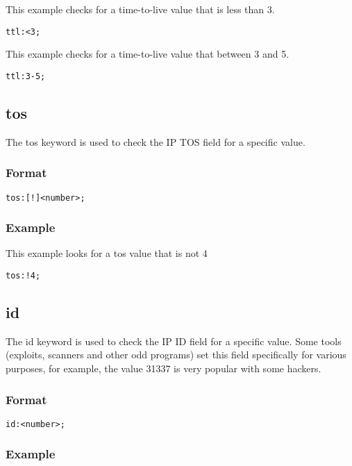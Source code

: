 \documentclass[english]{report}
\begin{document}
This example checks for a time-to-live value that is less than 3.
\begin{verbatim}
ttl:<3;
\end{verbatim}

This example checks for a time-to-live value that between 3 and 5.
\begin{verbatim}
ttl:3-5;
\end{verbatim}

\subsection{tos}

The tos keyword is used to check the IP TOS field for a specific value. 

\subsubsection{Format}

\begin{verbatim}
tos:[!]<number>;
\end{verbatim}

\subsubsection{Example}

This example looks for a tos value that is not 4
\begin{verbatim}
tos:!4;
\end{verbatim}

\subsection{id}

The id keyword is used to check the IP ID field for a specific value.  Some
tools (exploits, scanners and other odd programs) set this field specifically
for various purposes, for example, the value 31337 is very popular with some
hackers. 

\subsubsection{Format}

\begin{verbatim}
id:<number>;
\end{verbatim}

\subsubsection{Example}
\end{document}
